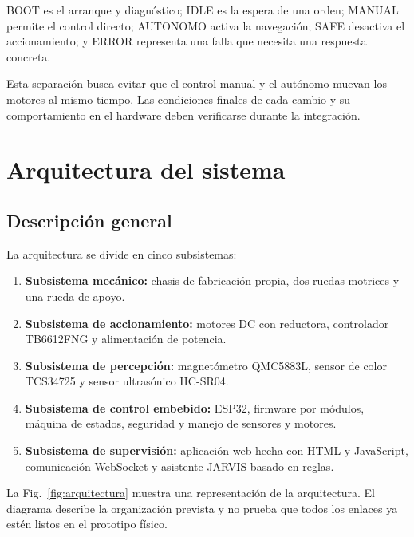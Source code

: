 \documentclass[journal]{IEEEtran}
\begin{document}
BOOT es el arranque y diagnóstico; IDLE es la espera de una orden; MANUAL permite el control directo; AUTONOMO activa la navegación; SAFE desactiva el accionamiento; y ERROR representa una falla que necesita una respuesta concreta.

Esta separación busca evitar que el control manual y el autónomo muevan los motores al mismo tiempo. Las condiciones finales de cada cambio y su comportamiento en el hardware deben verificarse durante la integración.


\section{Arquitectura del sistema}

\subsection{Descripción general}

La arquitectura se divide en cinco subsistemas:

\begin{enumerate}[1.]
    \item \textbf{Subsistema mecánico:} chasis de fabricación propia, dos ruedas motrices y una rueda de apoyo.

    \item \textbf{Subsistema de accionamiento:} motores DC con reductora, controlador TB6612FNG y alimentación de potencia.

    \item \textbf{Subsistema de percepción:} magnetómetro QMC5883L, sensor de color TCS34725 y sensor ultrasónico HC-SR04.

    \item \textbf{Subsistema de control embebido:} ESP32, firmware por módulos, máquina de estados, seguridad y manejo de sensores y motores.

    \item \textbf{Subsistema de supervisión:} aplicación web hecha con HTML y JavaScript, comunicación WebSocket y asistente JARVIS basado en reglas.
\end{enumerate}

La Fig.~\ref{fig:arquitectura} muestra una representación de la arquitectura. El diagrama describe la organización prevista y no prueba que todos los enlaces ya estén listos en el prototipo físico.
\end{document}
